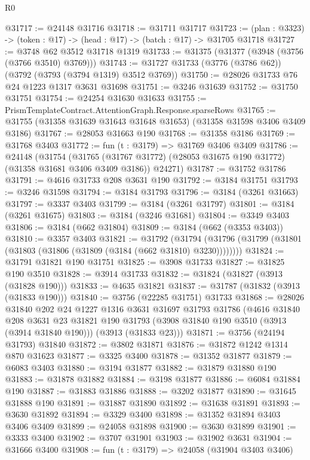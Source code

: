 \begin{lexlean}{R0}
\begin{coremodule}
@31717 := @24148 @31716
@31718 := @31711 @31717
@31723 := (plan : @3323) -> (token : @17) -> (head : @17) -> (batch : @17) -> @31705 @31718
@31727 := @3748 @62 @3512 @31718 @1319
@31733 := @31375 (@31377 (@3948 (@3756 (@3766 @3510) @3769)))
@31743 := @31727 @31733 (@3776 (@3786 @62)) (@3792 (@3793 (@3794 @1319) @3512 @3769))
@31750 := @28026 @31733 @76 @24 @1223 @1317 @3631 @31698
@31751 := @3246 @31639
@31752 := @31750 @31751
@31754 := @24254 @31630 @31633
@31755 := PrismTemplateContract.AttentionGraph.Response.sparseRows
@31765 := @31755 (@31358 @31639 @31643 @31648 @31653) (@31358 @31598 @3406 @3409 @3186)
@31767 := @28053 @31663 @190
@31768 := @31358 @3186
@31769 := @31768 @3403
@31772 := fun (t : @3179) => @31769 @3406 @3409
@31786 := @24148
    (@31754
      (@31765 (@31767 @31772) (@28053 @31675 @190 @31772) (@31358 @31681 @3406 @3409 @3186))
      @24271)
@31787 := @31752 @31786
@31791 := @4616 @31733 @208 @3631 @190
@31792 := @3184 @31751
@31793 := @3246 @31598
@31794 := @3184 @31793
@31796 := @3184 (@3261 @31663)
@31797 := @3337 @3403
@31799 := @3184 (@3261 @31797)
@31801 := @3184 (@3261 @31675)
@31803 := @3184 (@3246 @31681)
@31804 := @3349 @3403
@31806 := @3184 (@662 @31804)
@31809 := @3184 (@662 (@3353 @3403))
@31810 := @3357 @3403
@31821 := @31792
    (@31794 (@31796 (@31799 (@31801 (@31803 (@31806 (@31809 (@3184 (@662 @31810) @3230))))))))
@31824 := @31791 @31821 @190 @31751
@31825 := @3908 @31733
@31827 := @31825 @190 @3510
@31828 := @3914 @31733
@31832 := @31824 (@31827 (@3913 (@31828 @190)))
@31833 := @4635 @31821
@31837 := @31787 (@31832 (@3913 (@31833 @190)))
@31840 := @3756 (@22285 @31751) @31733
@31868 := @28026
    @31840
    @202
    @24
    @1227
    @1316
    @3631
    @31697
    @31793
    @31786
    (@4616
      @31840
      @208
      @3631
      @23
      @31821
      @190
      @31793
      (@3908 @31840 @190 @3510 (@3913 (@3914 @31840 @190)))
      (@3913 (@31833 @23)))
@31871 := @3756 (@24194 @31793) @31840
@31872 := @3802 @31871
@31876 := @31872 @1242 @1314 @870 @31623
@31877 := @3325 @3400
@31878 := @31352 @31877
@31879 := @6083 @3403
@31880 := @3194 @31877
@31882 := @31879 @31880 @190
@31883 := @31878 @31882
@31884 := @3198 @31877
@31886 := @6084 @31884 @190
@31887 := @31883 @31886
@31888 := @3202 @31877
@31890 := @31645 @31888 @190
@31891 := @31887 @31890
@31892 := @31638 @31891
@31893 := @3630 @31892
@31894 := @3329 @3400
@31898 := @31352 @31894 @3403 @3406 @3409
@31899 := @24058 @31898
@31900 := @3630 @31899
@31901 := @3333 @3400
@31902 := @3707 @31901
@31903 := @31902 @3631
@31904 := @31666 @3400
@31908 := fun (t : @3179) => @24058 (@31904 @3403 @3406)

\end{coremodule}
\end{lexlean}
